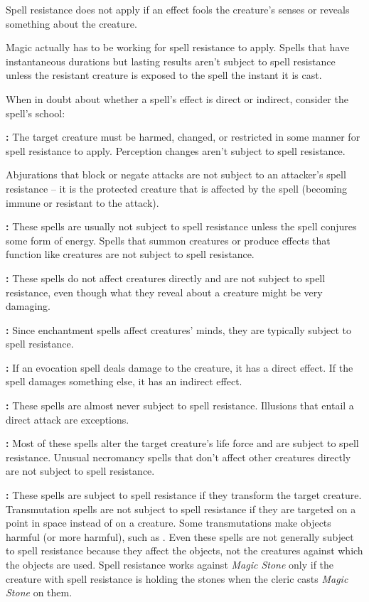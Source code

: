 Spell resistance does not apply if an effect fools the creature's senses or reveals 
something about the creature.

Magic actually has to be working for spell resistance to apply. Spells that have 
instantaneous durations but lasting results aren't subject to spell resistance 
unless the resistant creature is exposed to the spell the instant it is cast. 

When in doubt about whether a spell's effect is direct or indirect, consider the 
spell's school:

\textbf{:} The target creature must be harmed, changed, or restricted 
in some manner for spell resistance to apply. Perception changes aren't subject 
to spell resistance.

Abjurations that block or negate attacks are not subject to an attacker's spell 
resistance -- it is the protected creature that is affected by the spell (becoming 
immune or resistant to the attack).

\textbf{:} These spells are usually not subject to spell resistance 
unless the spell conjures some form of energy. Spells that summon creatures 
or produce effects that function like creatures are not subject to spell resistance.

\textbf{:} These spells do not affect creatures directly and are not 
subject to spell resistance, even though what they reveal about a creature might 
be very damaging.

\textbf{:} Since enchantment spells affect creatures' minds, they are 
typically subject to spell resistance.

\textbf{:} If an evocation spell deals damage to the creature, it has 
a direct effect. If the spell damages something else, it has an indirect effect.

\textbf{:} These spells are almost never subject to spell resistance. Illusions 
that entail a direct attack are exceptions.

\textbf{:} Most of these spells alter the target creature's life force 
and are subject to spell resistance. Unusual necromancy spells that don't affect 
other creatures directly are not subject to spell resistance.

\textbf{:} These spells are subject to spell resistance if they transform 
the target creature. Transmutation spells are not subject to spell resistance if 
they are targeted on a point in space instead of on a creature. Some transmutations 
make objects harmful (or more harmful), such as . Even these 
spells are not generally subject to spell resistance because they affect the objects, 
not the creatures against which the objects are used. Spell resistance works against 
\textit{Magic Stone} only if the creature with spell resistance is holding the 
stones when the cleric casts \textit{Magic Stone} on them. 

